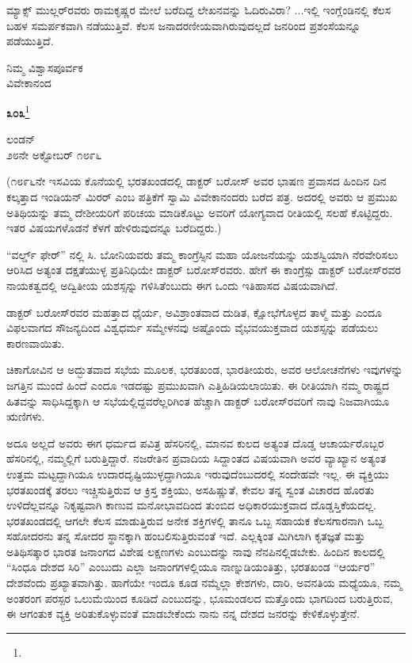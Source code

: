 ಮ್ಯಾಕ್ಸ್ ಮುಲ್ಲರ್‌ರವರು ರಾಮಕೃಷ್ಣರ ಮೇಲೆ ಬರೆದಿದ್ದ ಲೇಖನವನ್ನು ಓದಿರುವಿರಾ? ...ಇಲ್ಲಿ ಇಂಗ್ಲೆಂಡಿನಲ್ಲಿ ಕೆಲಸ ಬಹಳ ಸಮರ್ಪಕವಾಗಿ ನಡೆಯುತ್ತಿವೆ. ಕೆಲಸ ಜನಾದರಣೀಯವಾಗಿರುವುದಲ್ಲದೆ ಜನರಿಂದ ಪ್ರಶಂಸೆಯನ್ನೂ ಪಡೆಯುತ್ತಿದೆ.

{\flushright
ನಿಮ್ಮ ವಿಶ್ವಾಸಪೂರ್ವಕ\\ವಿವೇಕಾನಂದ\par}

\newpage

\begin{center}
\textbf{೩೦೩}\footnote{}
\end{center}

\begin{flushright}
ಲಂಡನ್\\೨೮ನೇ ಅಕ್ಟೋಬರ್ ೧೮೯೬
\end{flushright}

(೧೮೯೬ನೇ ಇಸವಿಯ ಕೊನೆಯಲ್ಲಿ ಭರತಖಂಡದಲ್ಲಿ ಡಾಕ್ಟರ್ ಬರೋಸ್ ಅವರ ಭಾಷಣ ಪ್ರವಾಸದ ಹಿಂದಿನ ದಿನ ಕಲ್ಕತ್ತಾದ ಇಂಡಿಯನ್ ಮಿರರ್ ಎಂಬ ಪತ್ರಿಕೆಗೆ ಸ್ವಾಮಿ ವಿವೇಕಾನಂದರು ಬರೆದ ಪತ್ರ. ಅದರಲ್ಲಿ ಅವರು ಆ ಪ್ರಮುಖ ಅತಿಥಿಯನ್ನು ತಮ್ಮ ದೇಶೀಯರಿಗೆ ಪರಿಚಯ ಮಾಡಿಕೊಟ್ಟು ಅವರಿಗೆ ಯೋಗ್ಯವಾದ ರೀತಿಯಲ್ಲಿ ಸಲಹೆ ಕೊಟ್ಟಿದ್ದರು. ಇತರ ವಿಷಯಗಳೊಡನೆ ಕೆಳಗೆ ಹೇಳಿರುವುದನ್ನೂ ಬರೆದಿದ್ದರು.)

“ವರ್ಲ್ಡ್ ಫೇರ್” ನಲ್ಲಿ ಸಿ. ಬೋನಿಯವರು ತಮ್ಮ ಕಾಂಗ್ರೆಸ್ಸಿನ ಮಹಾ ಯೋಜನೆಯನ್ನು ಯಶಸ್ವಿಯಾಗಿ ನೆರವೇರಿಸಲು ಆರಿಸಿದ ಅತ್ಯಂತ ದಕ್ಷತೆಯುಳ್ಳ ಪ್ರತಿನಿಧಿಯೇ ಡಾಕ್ಟರ್ ಬರೋಸ್‌ರವರು. ಹೇಗೆ ಈ ಕಾಂಗ್ರೆಸ್ಸು ಡಾಕ್ಟರ್ ಬರೋಸ್‌ರವರ ನಾಯಕತ್ವದಲ್ಲಿ ಅದ್ವಿತೀಯ ಯಶಸ್ಸನ್ನು ಗಳಿಸಿತೆಂಬುದು ಈಗ ಒಂದು ಇತಿಹಾಸದ ವಿಷಯವಾಗಿದೆ.

ಡಾಕ್ಟರ್ ಬರೋಸ್‌ರವರ ಮಹತ್ತಾದ ಧೈರ್ಯ, ಅವಿಶ್ರಾಂತವಾದ ದುಡಿತ, ಕ್ಷೋಭೆಗೊಳ್ಳದ ತಾಳ್ಮೆ ಮತ್ತು ಎಂದೂ ವಿಫಲವಾಗದ ಸೌಜನ್ಯದಿಂದ ವಿಶ್ವಧರ್ಮ ಸಮ್ಮೇಳನವು ಅಷ್ಟೊಂದು ವೈಭವಯುಕ್ತವಾದ ಯಶಸ್ಸನ್ನು ಪಡೆಯಲು ಕಾರಣವಾಯಿತು.

ಚಿಕಾಗೋವಿನ ಆ ಅದ್ಭುತವಾದ ಸಭೆಯ ಮೂಲಕ, ಭರತಖಂಡ, ಭಾರತೀಯರು, ಅವರ ಆಲೋಚನೆಗಳು\enginline{-} ಇವುಗಳನ್ನು ಜಗತ್ತಿನ ಮುಂದೆ ಹಿಂದೆ ಎಂದೂ ಇಡದಷ್ಟು ಪ್ರಮುಖವಾಗಿ ಎತ್ತಿಹಿಡಿಯಲಾಯಿತು. ಈ ರೀತಿಯಾಗಿ ನಮ್ಮ ರಾಷ್ಟ್ರದ ಹಿತವನ್ನು ಸಾಧಿಸಿದ್ದಕ್ಕಾಗಿ ಆ ಸಭೆಯಲ್ಲಿದ್ದವರೆಲ್ಲರಿಗಿಂತ ಹೆಚ್ಚಾಗಿ ಡಾಕ್ಟರ್ ಬರೋಸ್‌ರವರಿಗೆ ನಾವು ನಿಜವಾಗಿಯೂ ಋಣಿಗಳು.

ಅದೂ ಅಲ್ಲದೆ ಅವರು ಈಗ ಧರ್ಮದ ಪವಿತ್ರ ಹೆಸರಿನಲ್ಲಿ, ಮಾನವ ಕುಲದ ಅತ್ಯಂತ ದೊಡ್ಡ ಆಚಾರ್ಯರೊಬ್ಬರ ಹೆಸರಿನಲ್ಲಿ, ನಮ್ಮಲ್ಲಿಗೆ ಬರುತ್ತಿದ್ದಾರೆ. ನಜರೇತಿನ ಪ್ರವಾದಿಯ ಸಿದ್ದಾಂತದ ವಿಷಯವಾಗಿ ಅವರ ವ್ಯಾಖ್ಯಾನ ಅತ್ಯಂತ ಉತ್ತಮ ಮಟ್ಟದ್ದಾಗಿಯೂ ಉದಾರದೃಷ್ಟಿಯುಳ್ಳದ್ದಾಗಿಯೂ ಇರುವುದೆಂಬುದರಲ್ಲಿ ಸಂದೇಹವೇ ಇಲ್ಲ. ಈ ವ್ಯಕ್ತಿಯು ಭರತಖಂಡಕ್ಕೆ ತರಲು ಇಚ್ಚಿಸುತ್ತಿರುವ ಆ ಕ್ರಿಸ್ತ ಶಕ್ತಿಯು, ಅಸಹಿಷ್ಣುತೆ, ಕೇವಲ ತನ್ನ ಸ್ವಂತ ವಿಚಾರದ ಹೊರತು ಉಳಿದೆಲ್ಲವನ್ನೂ ನಿಕೃಷ್ಟವಾಗಿ ಕಾಣುವ ಮನೋಭಾವದಿಂದ ತುಂಬಿದ ಅಧಿಕಾರಯುಕ್ತವಾದ ದೊಡ್ಡಸ್ತಿಕೆಯದಲ್ಲ. ಭರತಖಂಡದಲ್ಲಿ ಆಗಲೇ ಕೆಲಸ ಮಾಡುತ್ತಿರುವ ಅನೇಕ ಶಕ್ತಿಗಳಲ್ಲಿ ತಾನೂ ಒಬ್ಬ ಸಹಾಯಕ ಕೆಲಸಗಾರನಾಗಿ ಒಬ್ಬ ಸಹೋದರನು ತನ್ನ ಸೋದರ ಸ್ಥಾನಕ್ಕಾಗಿ ಹಂಬಲಿಸುತ್ತಿರುವಂತೆ ಇದೆ. ಎಲ್ಲಕ್ಕಿಂತ ಮಿಗಿಲಾಗಿ ಕೃತಜ್ಞತೆ ಮತ್ತು ಅತಿಥಿಸತ್ಕಾರ ಭಾರತ ಜನಾಂಗದ ವಿಶೇಷ ಲಕ್ಷಣಗಳು ಎಂಬುದನ್ನು ನಾವು ನೆನಪಿನಲ್ಲಿಡಬೇಕು. ಹಿಂದಿನ ಕಾಲದಲ್ಲಿ “ಸಿಂಧೂ ದೇಶದ ಸಿರಿ” ಎಂಬುದು ಎಲ್ಲಾ ಜನಾಂಗಗಳಲ್ಲಿಯೂ ನಾಣ್ನುಡಿಯಂತಿತ್ತು, ಭರತಖಂಡ “ಆರ್ಯರ” ದೇಶವೆಂದು ಪ್ರಖ್ಯಾತವಾಗಿತ್ತು. ಹಾಗೆಯೇ ಇಂದೂ ಕೂಡ ನಮ್ಮೆಲ್ಲಾ ಕೇಶಗಳು, ದಾರಿ, ಅವನತಿಯ ಮಧ್ಯೆಯೂ, ನಮ್ಮ ಅಂತರಂಗ ಪರಸ್ಪರ ಒಲುಮೆಯಿಂದ ಕೂಡಿದೆ ಎಂಬುದನ್ನು, ಭೂಮಂಡಲದ ಮತ್ತೊಂದು ಭಾಗದಿಂದ ಬರುತ್ತಿರುವ, ಈ ಆಗಂತುಕ ವ್ಯಕ್ತಿ ಅರಿತುಕೊಳ್ಳುವಂತೆ ಮಾಡಬೇಕೆಂದು ನಾನು ನನ್ನ ದೇಶದ ಜನರನ್ನು ಕೇಳಿಕೊಳ್ಳುತ್ತೇನೆ.

